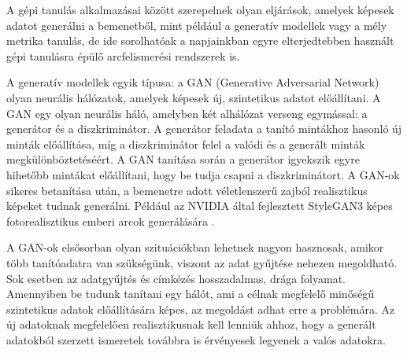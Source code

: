 % 


A gépi tanulás alkalmazásai között szerepelnek olyan eljárások, amelyek képesek adatot generálni a bemenetből, mint például a generatív modellek vagy a mély metrika tanulás, de ide sorolhatóak a napjainkban egyre elterjedtebben használt gépi tanulásra épülő arcfelismerési rendszerek is.


A generatív modellek egyik típusa: a GAN (Generative Adversarial Network) olyan neurális hálózatok, amelyek képesek új, szintetikus adatot előállítani. A GAN egy olyan neurális háló, amelyben két alhálózat verseng egymással: a generátor és a diszkriminátor. A generátor feladata a tanító mintákhoz hasonló új minták előállítása, míg a diszkriminátor felel a valódi és a generált minták megkülönböztetéséért. A GAN tanítása során a generátor igyekszik egyre hihetőbb mintákat előállítani, hogy be tudja csapni a diszkriminátort. A GAN-ok sikeres betanítása után, a bemenetre adott véletlenszerű zajból realisztikus képeket tudnak generálni. Például az NVIDIA által fejlesztett StyleGAN3 képes fotorealisztikus emberi arcok generálására \cite{stylegan3}.

A GAN-ok elsősorban olyan szituációkban lehetnek nagyon hasznosak, amikor több tanítóadatra van szükségünk, viszont az adat gyűjtése nehezen megoldható. Sok esetben az adatgyűjtés és címkézés hosszadalmas, drága folyamat. Amennyiben be tudunk tanítani egy hálót, ami a célnak megfelelő minőségű szintetikus adatok előállítására képes, az megoldást adhat erre a problémára. Az új adatoknak megfelelően realisztikusnak kell lenniük ahhoz, hogy a generált adatokból szerzett ismeretek továbbra is érvényesek legyenek a valós adatokra. 



